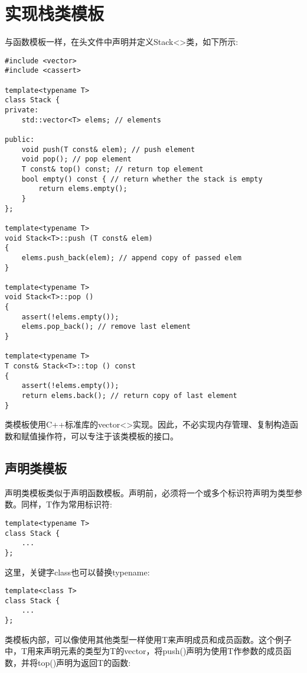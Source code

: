 \section{实现栈类模板}

与函数模板一样，在头文件中声明并定义Stack<>类，如下所示:

\begin{lstlisting}[style=styleCXX]
#include <vector>
#include <cassert>

template<typename T>
class Stack {
private:
	std::vector<T> elems; // elements
	
public:
	void push(T const& elem); // push element
	void pop(); // pop element
	T const& top() const; // return top element
	bool empty() const { // return whether the stack is empty
		return elems.empty();
	}
};

template<typename T>
void Stack<T>::push (T const& elem)
{
	elems.push_back(elem); // append copy of passed elem
}

template<typename T>
void Stack<T>::pop ()
{
	assert(!elems.empty());
	elems.pop_back(); // remove last element
}

template<typename T>
T const& Stack<T>::top () const
{
	assert(!elems.empty());
	return elems.back(); // return copy of last element
}
\end{lstlisting}

类模板使用C++标准库的vector<>实现。因此，不必实现内存管理、复制构造函数和赋值操作符，可以专注于该类模板的接口。

\subsection{声明类模板}

声明类模板类似于声明函数模板。声明前，必须将一个或多个标识符声明为类型参数。同样，T作为常用标识符:

\begin{lstlisting}[style=styleCXX]
template<typename T>
class Stack {
	...
};
\end{lstlisting}

这里，关键字class也可以替换typename:

\begin{lstlisting}[style=styleCXX]
template<class T>
class Stack {
	...
};
\end{lstlisting}

类模板内部，可以像使用其他类型一样使用T来声明成员和成员函数。这个例子中，T用来声明元素的类型为T的vector，将push()声明为使用T作参数的成员函数，并将top()声明为返回T的函数:


